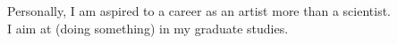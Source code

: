 \documentclass[a4paper, 12pt]{article}
\begin{document}
 

Personally, I am aspired to a career as an artist more than a scientist.\\


I aim at (doing something) in my graduate studies.\\
\end{document}

